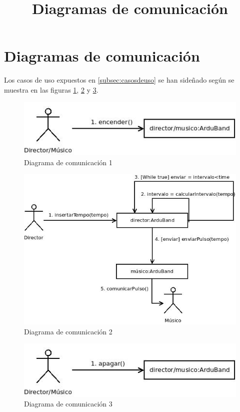 \section{Diagramas de comunicación}
\title{Diagramas de comunicación}

Los casos de uso expuestos en \ref{subsec:casosdeuso} se han sideñado según
se muestra en las figuras \ref{fig:comunicacion1},  \ref{fig:comunicacion2} y
\ref{fig:comunicacion3}.


\begin{figure}[htb]
\centering
\includegraphics[width=1\textwidth]{./imagenes/comunicacion1}
\caption{Diagrama de comunicación 1} \label{fig:comunicacion1}
\end{figure}

\begin{figure}[htb]
\centering
\includegraphics[width=1\textwidth]{./imagenes/comunicacion2}
\caption{Diagrama de comunicación 2} \label{fig:comunicacion2}
\end{figure}


\begin{figure}[htb]
\centering
\includegraphics[width=1\textwidth]{./imagenes/comunicacion3}
\caption{Diagrama de comunicación 3} \label{fig:comunicacion3}
\end{figure}
